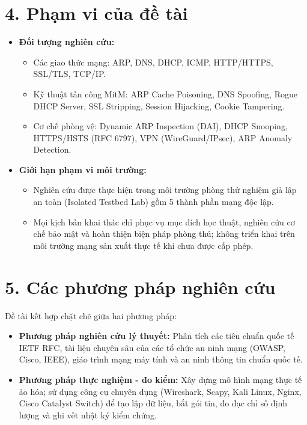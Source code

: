 \section*{4. Phạm vi của đề tài}

\begin{itemize}
  \item \textbf{Đối tượng nghiên cứu:}
    \begin{itemize}
      \item Các giao thức mạng: ARP, DNS, DHCP, ICMP, HTTP/HTTPS, SSL/TLS, TCP/IP.
      \item Kỹ thuật tấn công MitM: ARP Cache Poisoning, DNS Spoofing, Rogue DHCP Server, SSL Stripping, Session Hijacking, Cookie Tampering.
      \item Cơ chế phòng vệ: Dynamic ARP Inspection (DAI), DHCP Snooping, HTTPS/HSTS (RFC 6797), VPN (WireGuard/IPsec), ARP Anomaly Detection.
    \end{itemize}
  \item \textbf{Giới hạn phạm vi môi trường:}
    \begin{itemize}
      \item Nghiên cứu được thực hiện trong môi trường phòng thử nghiệm giả lập an toàn (Isolated Testbed Lab) gồm 5 thành phần mạng độc lập.
      \item Mọi kịch bản khai thác chỉ phục vụ mục đích học thuật, nghiên cứu cơ chế bảo mật và hoàn thiện biện pháp phòng thủ; không triển khai trên môi trường mạng sản xuất thực tế khi chưa được cấp phép.
    \end{itemize}
\end{itemize}

\section*{5. Các phương pháp nghiên cứu}

Đề tài kết hợp chặt chẽ giữa hai phương pháp:
\begin{itemize}
  \item \textbf{Phương pháp nghiên cứu lý thuyết:} Phân tích các tiêu chuẩn quốc tế IETF RFC, tài liệu chuyên sâu của các tổ chức an ninh mạng (OWASP, Cisco, IEEE), giáo trình mạng máy tính và an ninh thông tin chuẩn quốc tế.
  \item \textbf{Phương pháp thực nghiệm - đo kiểm:} Xây dựng mô hình mạng thực tế ảo hóa; sử dụng công cụ chuyên dụng (Wireshark, Scapy, Kali Linux, Nginx, Cisco Catalyst Switch) để tạo lập dữ liệu, bắt gói tin, đo đạc chỉ số định lượng và ghi vết nhật ký kiểm chứng.
\end{itemize}

